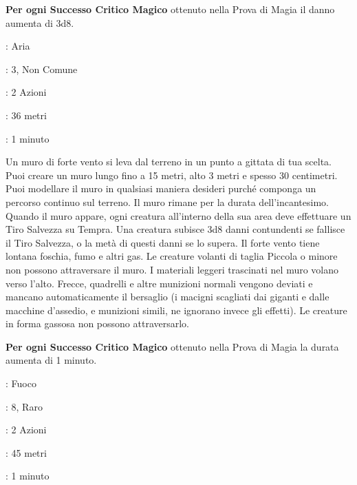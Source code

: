 \begin{multicols}{2}
\textbf{Per ogni Successo Critico Magico} ottenuto nella Prova di Magia il danno aumenta di 3d8.

\noindent\colorbox{OBSSgold!10}{
\begin{minipage}{0.95\linewidth}
\begin{description}[noitemsep, topsep=0pt, parsep=0pt, partopsep=0pt, leftmargin=0cm, labelwidth=1.3cm]
	\item[\textbf{Lista}]: Aria
	\item[\textbf{Livello}]: 3, Non Comune
	\item[\textbf{Lancio}]: 2 Azioni
	\item[\textbf{Gittata}]: 36 metri
	\item[\textbf{Durata}]: 1 minuto
\end{description}
\end{minipage}}\smallskip

Un muro di forte vento si leva dal terreno in un punto a gittata di tua scelta. Puoi creare un muro lungo fino a 15 metri, alto 3 metri e spesso 30 centimetri. Puoi modellare il muro in qualsiasi maniera desideri purché componga un percorso continuo sul terreno. Il muro rimane per la durata dell'incantesimo. Quando il muro appare, ogni creatura all'interno della sua area deve effettuare un Tiro Salvezza su Tempra. Una creatura subisce 3d8 danni contundenti se fallisce il Tiro Salvezza, o la metà di questi danni se lo supera. Il forte vento tiene lontana foschia, fumo e altri gas. Le creature volanti di taglia Piccola o minore non possono attraversare il muro. I materiali leggeri trascinati nel muro volano verso l'alto. Frecce, quadrelli e altre munizioni normali vengono deviati e mancano automaticamente il bersaglio (i macigni scagliati dai giganti e dalle macchine d'assedio, e munizioni simili, ne ignorano invece gli effetti). Le creature in forma gassosa non possono attraversarlo.

\textbf{Per ogni Successo Critico Magico} ottenuto nella Prova di Magia la durata aumenta di 1 minuto.

\noindent\colorbox{OBSSgold!10}{
\begin{minipage}{0.95\linewidth}
\begin{description}[noitemsep, topsep=0pt, parsep=0pt, partopsep=0pt, leftmargin=0cm, labelwidth=1.3cm]
	\item[\textbf{Lista}]: Fuoco
	\item[\textbf{Livello}]: 8, Raro
	\item[\textbf{Lancio}]: 2 Azioni
	\item[\textbf{Gittata}]: 45 metri
	\item[\textbf{Durata}]: 1 minuto
\end{description}
\end{minipage}}\smallskip


\end{multicols}
